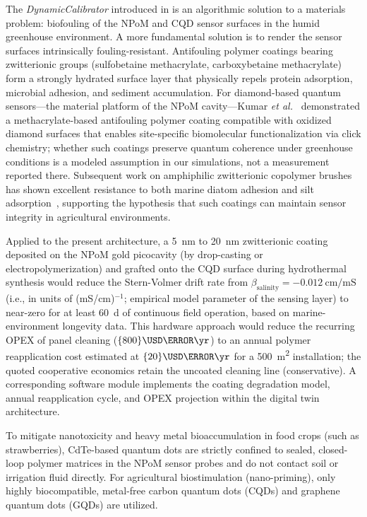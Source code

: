 \documentclass[11pt,a4paper]{article}
\begin{document}
The \textit{DynamicCalibrator} introduced in  is an algorithmic solution to a materials problem: biofouling of the NPoM and CQD sensor surfaces in the humid greenhouse environment. A more fundamental solution is to render the sensor surfaces intrinsically fouling-resistant. Antifouling polymer coatings bearing zwitterionic groups (sulfobetaine methacrylate, carboxybetaine methacrylate) form a strongly hydrated surface layer that physically repels protein adsorption, microbial adhesion, and sediment accumulation. For diamond-based quantum sensors---the material platform of the NPoM cavity---Kumar \emph{et al.}~\cite{Kumar2022} demonstrated a methacrylate-based antifouling polymer coating compatible with oxidized diamond surfaces that enables site-specific biomolecular functionalization via click chemistry; whether such coatings preserve quantum coherence under greenhouse conditions is a modeled assumption in our simulations, not a measurement reported there. Subsequent work on amphiphilic zwitterionic copolymer brushes has shown excellent resistance to both marine diatom adhesion and silt adsorption~\cite{Do2025}, supporting the hypothesis that such coatings can maintain sensor integrity in agricultural environments.

Applied to the present architecture, a \qty{5}{\nm} to \qty{20}{\nm} zwitterionic coating deposited on the NPoM gold picocavity (by drop-casting or electropolymerization) and grafted onto the CQD surface during hydrothermal synthesis would reduce the Stern-Volmer drift rate from $\beta_{\mathrm{salinity}} = \qty{-0.012}{\cm\per\milli\siemens}$ (i.e., in units of (mS/cm)$^{-1}$; empirical model parameter of the sensing layer) to near-zero for at least \qty{60}{\day} of continuous field operation, based on marine-environment longevity data. This hardware approach would reduce the recurring OPEX of panel cleaning ($\qty{800}{\USD\per\yr}$) to an annual polymer reapplication cost estimated at $\qty{20}{\USD\per\yr}$ for a \qty{500}{\m\squared} installation; the quoted cooperative economics retain the uncoated cleaning line (conservative). A corresponding software module implements the coating degradation model, annual reapplication cycle, and OPEX projection within the digital twin architecture.

To mitigate nanotoxicity and heavy metal bioaccumulation in food crops (such as strawberries), CdTe-based quantum dots are strictly confined to sealed, closed-loop polymer matrices in the NPoM sensor probes and do not contact soil or irrigation fluid directly. For agricultural biostimulation (nano-priming), only highly biocompatible, metal-free carbon quantum dots (CQDs) and graphene quantum dots (GQDs) are utilized.
\end{document}
